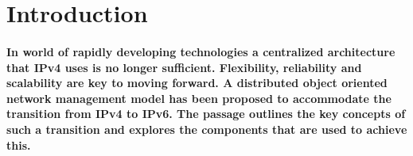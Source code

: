 
%
\section{Introduction}
	\paragraph{In world of rapidly developing technologies a centralized architecture that IPv4 uses is no longer sufficient. Flexibility, reliability and scalability are key to moving forward. A distributed object oriented network management model has been proposed to accommodate the transition from IPv4 to IPv6. 
The passage outlines the key concepts of such a transition and explores the components that are used to achieve this.}
%